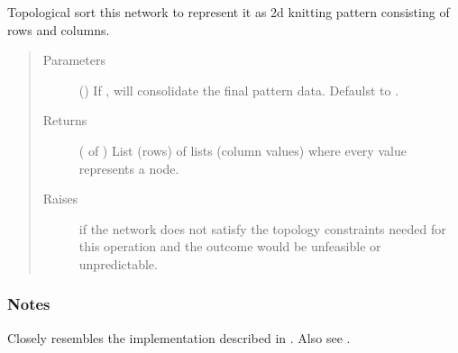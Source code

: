 \documentclass[letterpaper,10pt,english]{sphinxmanual}
\begin{document}
\begin{fulllineitems}
\begin{fulllineitems}
\label{\detokenize{cockatoo:cockatoo.KnitDiNetwork.make_pattern_data__STOLL}}
Topological sort this network to represent it as 2d knitting pattern
consisting of rows and columns.
\begin{quote}\begin{description}
\item[{Parameters}] \leavevmode
{} () \textendash{} If , will consolidate the final pattern data.
Defaulst to .

\item[{Returns}] \leavevmode
{} ( of ) \textendash{} List (rows) of lists (column values) where every value represents
a node.

\item[{Raises}] \leavevmode
{\hyperref[\detokenize{cockatoo:cockatoo.exception.KnitNetworkTopologyError}]{}} \textendash{} if the network does not satisfy the topology constraints needed for
    this operation and the outcome would be unfeasible or
    unpredictable.

\end{description}\end{quote}
\subsubsection*{Notes}

Closely resembles the implementation described in  \sphinxfootnotemark[1]. Also see
 \sphinxfootnotemark[2].

\end{fulllineitems}



\end{fulllineitems}
\end{document}
